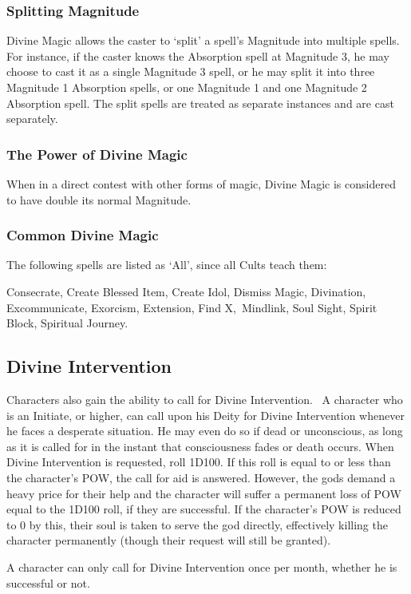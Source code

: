 \subsubsection{Splitting Magnitude}
Divine Magic allows the caster to ‘split’ a spell’s Magnitude into multiple spells. For instance, if the caster knows the Absorption spell at Magnitude 3, he may choose to cast it as a single Magnitude 3 spell, or he may split it into three Magnitude 1 Absorption spells, or one Magnitude 1 and one Magnitude 2 Absorption spell. The split spells are treated as separate instances and are cast separately.

\subsubsection{The Power of Divine Magic}
When in a direct contest with other forms of magic, Divine Magic is considered to have double its normal Magnitude.

\subsubsection{Common Divine Magic}
The following spells are listed as ‘All’, since all Cults teach them:

Consecrate, Create Blessed Item, Create Idol, Dismiss Magic, Divination, Excommunicate, Exorcism, Extension, Find X, Mindlink, Soul Sight, Spirit Block, Spiritual Journey.

\subsection{Divine Intervention}
Characters also gain the ability to call for Divine Intervention. 
A character who is an Initiate, or higher, can call upon his Deity for Divine Intervention whenever he faces a desperate situation. He may even do so if dead or unconscious, as long as it is called for in the instant that consciousness fades or death occurs. When Divine Intervention is requested, roll 1D100. If this roll is equal to or less than the character’s POW, the call for aid is answered. However, the gods demand a heavy price for their help and the character will suffer a permanent loss of POW equal to the 1D100 roll, if they are successful. If the character’s POW is reduced to 0 by this, their soul is taken to serve the god directly, effectively killing the character permanently (though their request will still be granted). 

A character can only call for Divine Intervention once per month, whether he is successful or not. 

